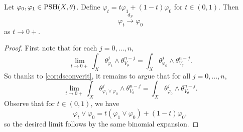 \begin{corollary}\label{cor:lineardsconv}
    Let $\varphi_0,\varphi_1\in \mathrm{PSH}(X,\theta)$. Define $\varphi_t=t\varphi_1+(1-t)\varphi_0$ for $t\in (0,1)$.
    Then
    \[
    \varphi_t\xrightarrow{d_S}\varphi_0
    \]
    as $t\to 0+$.
\end{corollary}
\begin{proof}
First note that for each $j=0,\ldots,n$,
\[
\lim_{t\to 0+}\int_X \theta_{\varphi_t}^j\wedge \theta_{V_{\theta}}^{n-j}=\int_X \theta_{\varphi_0}^j\wedge \theta_{V_{\theta}}^{n-j}.
\]
So thanks to \cref{cor:dsconvcrit}, it remains to argue that for all $j=0,\ldots,n$,
\[
\lim_{t\to 0+}\int_X \theta_{\varphi_t\lor \varphi_0}^j\wedge \theta_{V_{\theta}}^{n-j}=\int_X \theta_{\varphi_0}^j\wedge \theta_{V_{\theta}}^{n-j}.
\]
Observe that for $t\in (0,1)$, we have
\[
\varphi_t\lor \varphi_0=t(\varphi_1\lor \varphi_0)+(1-t)\varphi_0,
\]
so the desired limit follows by the same binomial expansion.
\end{proof}

